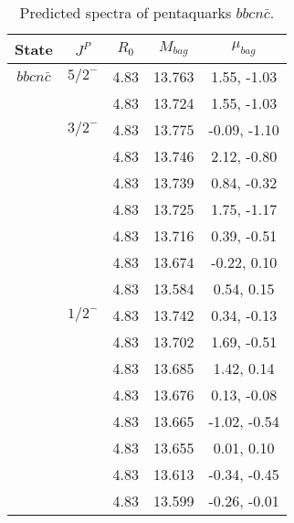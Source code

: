 \documentclass[prd,twocolumn,floatfix,nofootinbib]{revtex4}
\begin{document}
\renewcommand{\tabcolsep}{0.5cm}
\renewcommand{\arraystretch}{1.2}
\begin{table*}[!htbp]
    \caption{Predicted spectra of pentaquarks $bbcn\bar{c}$.}
    \begin{tabular}{ccccc}
        \hline\hline
        {\rm State} &$J^{P}$ &$R_{0}$ &$M_{bag}$ &$\mu_{bag}$ \\ \hline
        ${bbcn\bar{c}}$
            &${5/2}^{-}$    &4.83   &13.763 &1.55, -1.03 \\
            &               &4.83   &13.724 &1.55, -1.03 \\
            &${3/2}^{-}$    &4.83   &13.775 &-0.09, -1.10 \\
            &               &4.83   &13.746 &2.12, -0.80 \\
            &               &4.83   &13.739 &0.84, -0.32 \\
            &               &4.83   &13.725 &1.75, -1.17 \\
            &               &4.83   &13.716 &0.39, -0.51 \\
            &               &4.83   &13.674 &-0.22, 0.10 \\
            &               &4.83   &13.584 &0.54, 0.15 \\
            &${1/2}^{-}$    &4.83   &13.742 &0.34, -0.13 \\
            &               &4.83   &13.702 &1.69, -0.51 \\
            &               &4.83   &13.685 &1.42, 0.14 \\
            &               &4.83   &13.676 &0.13, -0.08 \\
            &               &4.83   &13.665 &-1.02, -0.54 \\
            &               &4.83   &13.655 &0.01, 0.10 \\
            &               &4.83   &13.613 &-0.34, -0.45 \\
            &               &4.83   &13.599 &-0.26, -0.01 \\
        \hline\hline 
    \end{tabular}
\end{table*}
\end{document}
